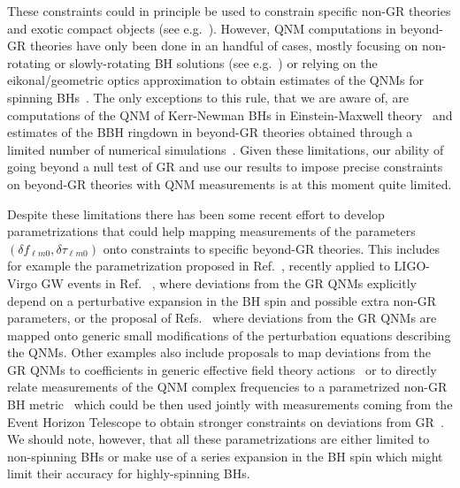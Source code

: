 These constraints could in principle be used to constrain specific
non-GR theories and exotic compact objects (see
e.g.~\cite{Glampedakis:2017cgd,Cardoso:2019rvt,Maggio:2020jml}). However,
QNM computations in beyond-GR theories have only been done in an
handful of cases, mostly focusing on non-rotating or slowly-rotating
BH solutions (see
e.g.~\cite{Ferrari:2000ep,Molina:2010fb,Pani:2009wy,Blazquez-Salcedo:2016enn,Blazquez-Salcedo:2017txk,Brito:2018hjh,Franciolini:2018uyq,Cardoso:2018ptl,Tattersall:2018nve,Tattersall:2019nmh,Blazquez-Salcedo:2019nwd,Silva:2019scu,Glampedakis:2019dqh,Blazquez-Salcedo:2020jee,Blazquez-Salcedo:2020caw,Cano:2020cao})
or relying on the eikonal/geometric optics approximation to obtain
estimates of the QNMs for spinning
BHs~\cite{Blazquez-Salcedo:2016enn,Glampedakis:2017dvb,Jai-akson:2017ldo}. The
only exceptions to this rule, that we are aware of, are computations
of the QNM of Kerr-Newman BHs in Einstein-Maxwell
theory~\cite{Pani:2013ija,Pani:2013wsa,Mark:2014aja,Dias:2015wqa} and
estimates of the BBH ringdown in beyond-GR theories obtained through a
limited number of numerical
simulations~\cite{Okounkova:2019dfo,Okounkova:2019zjf}. Given these
limitations, our ability of going beyond a null test of GR and use our
results to impose precise constraints on beyond-GR theories with QNM
measurements is at this moment quite limited.

Despite these limitations there has been some recent effort to develop
parametrizations that could help mapping measurements of the
parameters $(\delta f_{\ell m 0}, \delta \tau_{\ell m0})$ onto
constraints to specific beyond-GR theories. This includes for example
the parametrization proposed in Ref.~\cite{Maselli:2019mjd}, recently
applied to LIGO-Virgo GW events in Ref. ~\cite{Carullo:2021dui}, where
deviations from the GR QNMs explicitly depend on a perturbative
expansion in the BH spin and possible extra non-GR parameters, or the
proposal of Refs.~\cite{Cardoso:2019mqo,McManus:2019ulj} where
deviations from the GR QNMs are mapped onto generic small
modifications of the perturbation equations describing the QNMs. Other
examples also include proposals to map deviations from the GR QNMs to
coefficients in generic effective field theory
actions~\cite{Cardoso:2018ptl,Franciolini:2018uyq,Cano:2020cao} or to
directly relate measurements of the QNM complex frequencies to a
parametrized non-GR BH
metric~\cite{Glampedakis:2017dvb,Suvorov:2021amy,Volkel:2020daa} which
could be then used jointly with measurements coming from the Event
Horizon Telescope to obtain stronger constraints on deviations from
GR~\cite{Volkel:2020daa,Volkel:2020xlc,Psaltis:2020lvx,Yang:2021zqy}.
We should note, however, that all these parametrizations are either
limited to non-spinning BHs or make use of a series expansion in the
BH spin which might limit their accuracy for highly-spinning BHs.


